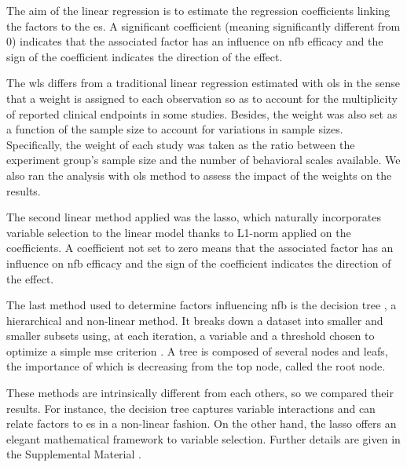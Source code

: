 The aim of the linear regression is to estimate the regression coefficients
linking the factors to the \gls{es}. A significant coefficient (meaning significantly different from 0) indicates 
that the associated factor has an influence on \gls{nfb} efficacy and the sign of the coefficient indicates
the direction of the effect.

The \gls{wls} differs from a traditional linear regression estimated with \gls{ols} in the sense that a weight is assigned 
to each observation so as to account for the multiplicity of reported clinical endpoints in some studies. Besides, the 
weight was also set as a function of the sample size to account for variations in sample sizes. Specifically, the weight of each study 
was taken as the ratio between the experiment group's sample size and the number of behavioral scales available.
We also ran the analysis with \gls{ols} method to assess the impact of the weights on the results. 

The second linear method applied was the \gls{lasso}, which naturally incorporates variable selection 
to the linear model thanks to L1-norm applied on the coefficients. A coefficient not set to zero means that 
the associated factor has an influence on \gls{nfb} efficacy and the sign of the coefficient indicates the 
direction of the effect.

The last method used to determine factors influencing \gls{nfb} is the decision tree \citep{Quinlan1986}, a hierarchical 
and non-linear method. It breaks down a dataset into smaller and smaller subsets using, at each iteration, a variable and 
a threshold chosen to optimize a simple \gls{mse} criterion \citep{James2013}. A tree is composed of several nodes and leafs, 
the importance of which is decreasing from the top node, called the root node. 

These methods are intrinsically different from each others, so we compared their results. For instance, the decision
tree captures variable interactions and can relate factors to \gls{es} in a non-linear fashion. On the other hand, the
\gls{lasso} offers an elegant mathematical framework to variable selection. Further details are given in the Supplemental Material
\citep{Supplementalmaterial}.
















